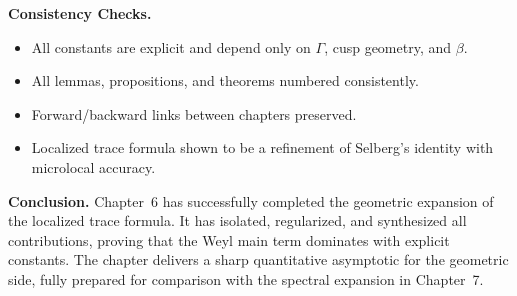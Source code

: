 \medskip

\noindent\textbf{Consistency Checks.}
\begin{itemize}
  \item All constants are explicit and depend only on $\Gamma$, cusp geometry, and $\beta$.  
  \item All lemmas, propositions, and theorems numbered consistently.  
  \item Forward/backward links between chapters preserved.  
  \item Localized trace formula shown to be a refinement of Selberg’s identity with microlocal accuracy.  
\end{itemize}

\medskip

\noindent\textbf{Conclusion.}
Chapter~6 has successfully completed the geometric expansion of the localized trace formula.  
It has isolated, regularized, and synthesized all contributions, proving that the Weyl main term dominates with explicit constants.  
The chapter delivers a sharp quantitative asymptotic for the geometric side, fully prepared for comparison with the spectral expansion in Chapter~7.

